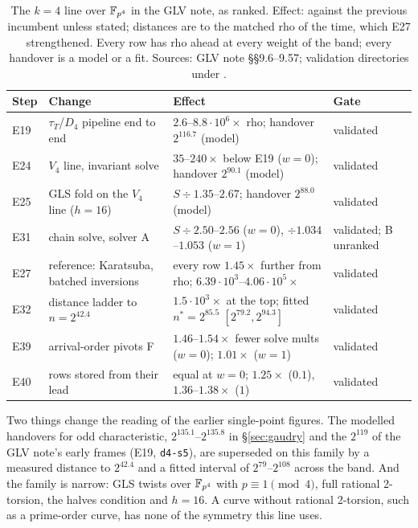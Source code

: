 \begin{table}[t]
\centering\small
\begin{tabularx}{\linewidth}{@{}l>{\raggedright}X>{\raggedright}p{3.3cm}>{\raggedright\arraybackslash}p{2.6cm}@{}}
\toprule
Step & Change & Effect & Gate \\
\midrule
E19 & $\tau_T$/$D_4$ pipeline end to end & $2.6$--$8.8\cdot10^6\times$ rho; handover $2^{116.7}$ (model) & validated \\
E24 & $V_4$ line, invariant solve & $35$--$240\times$ below E19 ($w=0$); handover $2^{90.1}$ (model) & validated \\
E25 & GLS fold on the $V_4$ line ($h=16$) & $S\div1.35$--$2.67$; handover $2^{88.0}$ (model) & validated \\
E31 & chain solve, solver A & $S\div2.50$--$2.56$ ($w=0$), $\div1.034$--$1.053$ ($w=1$) & validated; B unranked \\
E27 & reference: Karatsuba, batched inversions & every row $1.45\times$ further from rho; $6.39\cdot10^3$--$4.06\cdot10^5\times$ & validated \\
E32 & distance ladder to $n=2^{42.4}$ & $1.5\cdot10^3\times$ at the top; fitted $n^*=2^{85.5}$ $[2^{79.2},2^{94.3}]$ & validated \\
E39 & arrival-order pivots F & $1.46$--$1.54\times$ fewer solve mults ($w=0$); $1.01\times$ ($w=1$) & validated \\
E40 & rows stored from their lead & equal at $w=0$; $1.25\times$ ($0.1$), $1.36$--$1.38\times$ ($1$) & validated \\
\bottomrule
\end{tabularx}
\caption[]{The $k=4$ line over $\mathbb{F}_{p^4}$ in the GLV note, as ranked. Effect:
against the previous incumbent unless stated; distances are to the matched
rho of the time, which E27 strengthened. Every row has rho ahead at every
weight of the band; every handover is a model or a fit. Sources: GLV note
\S\S9.6--9.57; validation directories under .}
\label{tab:glv-ladder}
\end{table}

Two things change the reading of the earlier single-point figures. The
modelled handovers for odd characteristic, $2^{135.1}$--$2^{135.8}$ in
\S\ref{sec:gaudry} and the $2^{119}$ of the GLV note's early frames (E19,
\texttt{d4-s5}), are
superseded on this family by a measured distance to $2^{42.4}$ and a fitted
interval of $2^{79}$--$2^{108}$ across the band. And the family is narrow: GLS
twists over $\mathbb{F}_{p^4}$ with $p\equiv1\pmod4$, full rational 2-torsion, the halves
condition and $h=16$. A curve without rational 2-torsion, such as a
prime-order curve, has none of the symmetry this line uses.

